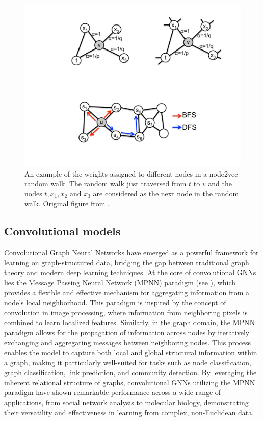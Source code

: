 \begin{figure}
	\includegraphics[width=0.6\linewidth]{images/node2vec-weights.pdf}
	\caption{An example of the weights assigned to different nodes in a node2vec random walk. The random walk just traversed from \( t \) to \( v \) and the nodes \( t, x_1, x_2 \) and \( x_3 \) are considered as the next node in the random walk. Original figure from \cite{grover_node2vec_2016}.}
	\label{fig:node2vec-weights}
\end{figure}


\subsection{Convolutional models}

Convolutional Graph Neural Networks have emerged as a powerful framework for learning on graph-structured data, bridging the gap between traditional graph theory and modern deep learning techniques. At the core of convolutional GNNs lies the Message Passing Neural Network (MPNN) paradigm (see \cite{gilmer_neural_2017}), which provides a flexible and effective mechanism for aggregating information from a node's local neighborhood. This paradigm is inspired by the concept of convolution in image processing, where information from neighboring pixels is combined to learn localized features. Similarly, in the graph domain, the MPNN paradigm allows for the propagation of information across nodes by iteratively exchanging and aggregating messages between neighboring nodes. This process enables the model to capture both local and global structural information within a graph, making it particularly well-suited for tasks such as node classification, graph classification, link prediction, and community detection. By leveraging the inherent relational structure of graphs, convolutional GNNs utilizing the MPNN paradigm have shown remarkable performance across a wide range of applications, from social network analysis to molecular biology, demonstrating their versatility and effectiveness in learning from complex, non-Euclidean data.

